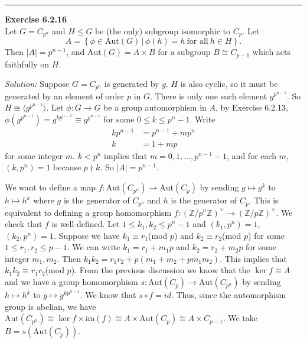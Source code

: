 \documentclass[a4paper, 12pt]{article}
\newenvironment{problem}[2][Exercise]
    { \begin{mdframed}[backgroundcolor=gray!20] \textbf{#1 #2} \\}
    {  \end{mdframed}}
\newenvironment{solution}
    {\textit{Solution:}}
    {}
\begin{document}
\noindent\rule{7in}{2.8pt}
\begin{problem}{6.2.16}
Let \(G=C_{p^n}\) and \(H\leq G\) be (the only)	subgroup isomorphic to \(C_p\). Let 
\[A=\left\{ \phi\in \text{Aut}(G)\,|\, \phi(h)=h\ \text{for all}\ h\in H\right\}.\]
Then \(|A|=p^{n-1}\), and \(\text{Aut}(G)=A\times B\) for a subgroup \(B\cong C_{p-1}\) which acts faithfully on \(H\).
\end{problem}
\begin{solution}
Suppose \(G=C_{p^n}\) is generated by \(g\). \(H\) is also cyclic, so it must be generated by an element of order \(p\) in \(G\). There is only one such element \(g^{p^{n-1}}\). So \(H\cong \langle g^{p^{n-1}}\rangle\). Let 
\(\phi:G\rightarrow G\) be a group automorphism in \(A\), by Exercise 6.2.13, \(\phi(g^{p^{n-1}})=g^{kp^{n-1}}\equiv g^{p^{n-1}}\) for some \(0\leq k\leq p^{n}-1\). Write 
\begin{align*}
	kp^{n-1}&=p^{n-1}+mp^n\\ 
	k       &=1+mp
\end{align*}
for some integer \(m\). \(k<p^n\) implies that \(m=0,1,\ldots, p^{n-1}-1\), and for each \(m\), \((k,p^n)=1\) because \(p\nmid k\). So \(|A|=p^{n-1}\).

We want to define a map \(f:\text{Aut}(C_{p^n})\rightarrow \text{Aut}(C_p)\) by sending \(g\mapsto g^k\) to \(h\mapsto h^k\) where \(g\) is the generator of \(C_{p^n}\) and \(h\) is the generator of \(C_p\). This is equivalent to defining 
a group homomorphism \(f:(\mathbb{Z}/p^n \mathbb{Z})^\times \rightarrow (\mathbb{Z}/ p \mathbb{Z})^\times\). We check that \(f\) is well-defined. Let \(1\leq k_1,k_2\leq p^n-1\) and \((k_1,p^n)=1\), \((k_2,p^n)=1\). Suppose we have 
\(k_1\equiv r_1\)(mod \(p\)) and \(k_2\equiv r_2\)(mod \(p\)) for some \(1\leq r_1,r_2\leq p-1\). We can write \(k_1=r_1+m_1p\) and \(k_2=r_2+m_2p\) for some integer \(m_1,m_2\). Then 
\(k_1k_2=r_1r_2+p(m_1+m_2+pm_1m_2)\). This implies that \(k_1k_2\equiv r_1r_2\)(mod \(p\)). From the previous discussion we know that the \(\ker f\cong A\) and we have a group homomorphism \(s:\text{Aut}(C_p)\rightarrow \text{Aut}(C_{p^n})\) by sending \(h\mapsto h^k\) to 
\(g\mapsto g^{k p^{n-1}}\). We know that \(s\circ f=id\). Thus, since the automorphism group is abelian, we have \(\text{Aut}(C_{p^n})\cong \ker f\times \text{im}(f)\cong A\times \text{Aut}(C_p)\cong A\times C_{p-1}\). We take \(B=s(\text{Aut}(C_p))\). 


\end{solution}
\end{document}
